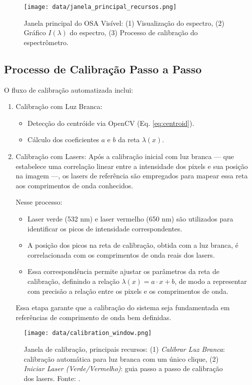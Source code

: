 \documentclass[a4paper]{ifacconf}
\begin{document}
\begin{figure}[ht]
    \centering
    \texttt{[image: data/janela\_principal\_recursos.png]}
    \caption{Janela principal do OSA Visível: (1) Visualização do espectro, (2) Gráfico $I(\lambda)$ do espectro, (3) Processo de calibração do espectrômetro.}
    \label{fig:gui}
\end{figure}

\subsection{Processo de Calibração Passo a Passo}
\label{subsec:calib_software}
O fluxo de calibração automatizada inclui:
\begin{enumerate}
    \item Calibração com Luz Branca:
    \begin{itemize}
        \item Detecção do centróide via OpenCV (Eq. \ref{eq:centroid}).
        \item Cálculo dos coeficientes $a$ e $b$ da reta $\lambda(x)$.
    \end{itemize}
    
    \item Calibração com Lasers:
Após a calibração inicial com luz branca — que estabelece uma correlação linear entre a intensidade dos pixels e sua posição na imagem —, os lasers de referência são empregados para mapear essa reta aos comprimentos de onda conhecidos. 

Nesse processo:
\begin{itemize}
    \item Laser verde (532 nm) e laser vermelho (650 nm) são utilizados para identificar os picos de intensidade correspondentes.
    \item A posição dos picos na reta de calibração, obtida com a luz branca, é correlacionada com os comprimentos de onda reais dos lasers.
    \item Essa correspondência permite ajustar os parâmetros da reta de calibração, definindo a relação \(\lambda(x) = a \cdot x + b\), de modo a representar com precisão a relação entre os pixels e os comprimentos de onda.
\end{itemize}

Essa etapa garante que a calibração do sistema seja fundamentada em referências de comprimento de onda bem definidas.
\end{enumerate}

\begin{figure}[ht]
    \centering
    \texttt{[image: data/calibration\_window.png]}
    \caption{Janela de calibração, principais recursos: (1)\textit{ Calibrar Luz Branca}: calibração automática para luz branca com um único clique, (2) \textit{Iniciar Laser (Verde/Vermelho)}: guia passo a passo de calibração dos lasers. Fonte: \cite{autoria_propria}.}
    \label{fig:calib_gui}
\end{figure} 
\end{document}
